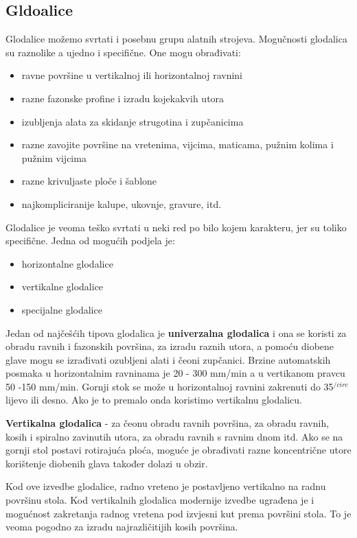 \documentclass[a4paper,12pt]{article}
\numberwithin{figure}{section}
\begin{document}
\subsection{Gldoalice}
Glodalice možemo svrtati i posebnu grupu alatnih strojeva. Mogučnosti glodalica su raznolike a ujedno i specifične. One mogu obrađivati:
\begin{itemize}
\item ravne površine u vertikalnoj ili horizontalnoj ravnini
\item razne fazonske profine i izradu kojekakvih utora
\item izubljenja alata za skidanje strugotina i zupčanicima
\item razne zavojite površine na vretenima, vijcima, maticama, pužnim kolima i pužnim vijcima
\item razne krivuljaste ploče i šablone
\item najkompliciranije kalupe, ukovnje, gravure, itd.
\end{itemize}
Glodalice je veoma teško svrtati u neki red po bilo kojem karakteru, jer su toliko specifične. Jedna od mogućih podjela je:
\begin{itemize}
\item horizontalne glodalice
\item vertikalne glodalice
\item specijalne glodalice
\end{itemize}
Jedan od najčešćih tipova glodalica je \textbf{univerzalna glodalica} i ona se koristi za obradu ravnih i fazonskih površina, za izradu raznih utora, a pomoću diobene glave mogu se izrađivati ozubljeni alati i čeoni zupčanici.
Brzine automatskih posmaka u horizontalnim ravninama je 20 - 300 mm/min a u vertikanom pravcu 50 -150 mm/min. Gornji stok se može u horizontalnoj ravnini zakrenuti do 35$^{/circ}$ lijevo ili desno. Ako je to premalo onda koristimo vertikalnu glodalicu.\par
\textbf{Vertikalna glodalica} - za čeonu obradu ravnih površina, za obradu ravnih, kosih i spiralno zavinutih utora, za obradu ravnih s ravnim dnom itd. Ako se na gornji stol postavi rotirajuća ploća, moguće je obrađivati razne koncentrične utore korištenje diobenih glava također dolazi u obzir.\par
Kod ove izvedbe glodalice, radno vreteno je postavljeno vertikalno na radnu površinu stola. Kod vertikalnih glodalica modernije izvedbe ugrađena je i mogućnost zakretanja radnog vretena pod izvjesni kut prema površini stola. To je veoma pogodno za izradu najrazličitijih kosih površina.\par
\end{document}
